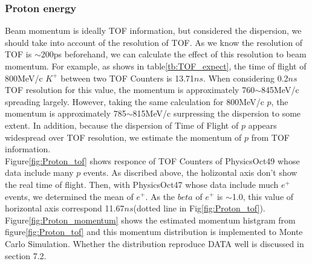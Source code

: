    \subsubsection{Proton energy}\label{proton_energy_section}

Beam momentum is ideally TOF information,
but considered the dispersion, we should take into account of the resolution of TOF.
As we know the resolution of TOF is $\sim$200ps beforehand,
we can calculate the effect of this resolution to beam momentum.
For example, as shows in table\ref{tb:TOF_expect}, 
the time of flight of 800MeV/c $K^{+}$ between two TOF Counters is 13.71$ns$.
When considering 0.2$ns$ TOF resolution for this value,
the momentum is approximately 760$\sim$845MeV/c spreading largely.
However, taking the same calculation for 800MeV/c $p$,
the momentum is approximately 785$\sim$815MeV/c surpressing the dispersion to some extent.
In addition, because the dispersion of Time of Flight of $p$ appears widespread over TOF resolution,
we estimate the momentum of $p$ from TOF information.\\
Figure\ref{fig:Proton_tof} shows responce of TOF Counters of PhysicsOct49 whose data include many $p$ events.
As discribed above, the holizontal axis don't show the real time of flight.
Then, with PhysicsOct47 whose data include much $e^{+}$ events, we determined the mean of $e^{+}$.
As the $beta$ of $e^{+}$ is $\sim$1.0, this value of horizontal axis correspond 11.67$ns$(dotted line in Fig\ref{fig:Proton_tof}).
Figure\ref{fig:Proton_momentum} shows the estimated momentum histgram from figure\ref{fig:Proton_tof}
and this momentum distribution is implemented to Monte Carlo Simulation.
Whether the distribution reproduce DATA well is discussed in section 7.2.


